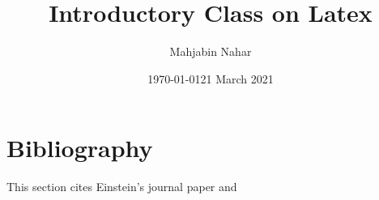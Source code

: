 \title{Introductory Class on Latex}
 \author{Mahjabin Nahar}
 \date{\today}
 \date{21 March 2021}

 
 \maketitle
 \tableofcontents %
 \pagebreak %

 \section{Bibliography}
 This section cites Einstein's journal paper \cite{afnan} and \cite{sihat} 

 \printbibliography


 